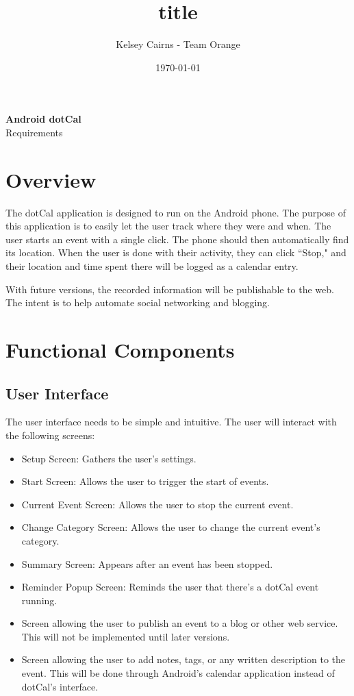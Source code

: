 \documentclass[11pt]{article}
\title{title}
\author{Kelsey Cairns - Team Orange}
\date{\today} %
\begin{document}
\begin{centering}
\textbf{\huge{Android dotCal}}\\
\LARGE{Requirements}

\end{centering}

\tableofcontents

\section{Overview}

The dotCal application is designed to run on the Android phone. The purpose of this application is to easily let the user track where they were and when. The user starts an event with a single click. The phone should then automatically find its location. When the user is done with their activity, they can click ``Stop," and their location and time spent there will be logged as a calendar entry.

With future versions, the recorded information will be publishable to the web. The intent is to help automate social networking and blogging.

\section{Functional Components}

\subsection{User Interface}

The user interface needs to be simple and intuitive. The user will interact with the following screens:

\begin{itemize}
	\item{Setup Screen: Gathers the user's settings.}
	\item{Start Screen: Allows the user to trigger the start of events.}
	\item{Current Event Screen: Allows the user to stop the current event.}
	\item{Change Category Screen: Allows the user to change the current event's category.}
	\item{Summary Screen: Appears after an event has been stopped.}
	\item{Reminder Popup Screen: Reminds the user that there's a dotCal event running.}
	\item{Screen allowing the user to publish an event to a blog or other web service. This will not be implemented until later versions.}
	\item{Screen allowing the user to add notes, tags, or any written description to the event. This will be done through Android's calendar application instead of dotCal's interface.}
\end{itemize}
\end{document}
